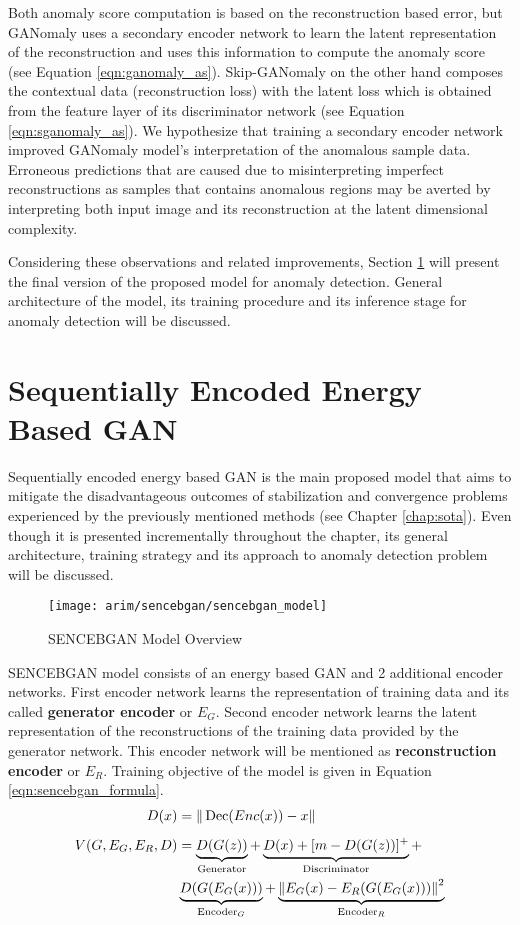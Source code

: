 Both anomaly score computation is based on the reconstruction based error, but GANomaly uses a
secondary encoder network to learn the latent representation of the reconstruction and uses this
information to compute the anomaly score (see Equation \ref{eqn:ganomaly_as}). Skip-GANomaly on the
other hand composes the contextual data (reconstruction loss) with the latent loss which is obtained
from the feature layer of its discriminator network (see Equation \ref{eqn:sganomaly_as}). We hypothesize
that training a secondary encoder network improved GANomaly model's interpretation of the anomalous
sample data. Erroneous predictions that are caused due to misinterpreting imperfect reconstructions
as samples that contains anomalous regions may be averted by interpreting both input image and its
reconstruction at the latent dimensional complexity. 

Considering these observations and related improvements, Section \ref{sec:sencebgan} will present the final version
of the proposed model for anomaly detection. General architecture of the model, its training
procedure and its inference stage for anomaly detection will be discussed.


\section{Sequentially Encoded Energy Based GAN}
\label{sec:sencebgan}

Sequentially encoded energy based GAN is the main proposed model that
aims to mitigate the disadvantageous outcomes of stabilization and convergence problems experienced
by the previously mentioned methods (see Chapter \ref{chap:sota}). Even though it is presented
incrementally throughout the chapter, its general architecture, training strategy and its approach
to anomaly detection problem will be discussed.
\begin{figure}[h!]
	\centering
	\texttt{[image: arim/sencebgan/sencebgan\_model]}
	\caption{SENCEBGAN Model Overview }
	\label{fig:sencebgan_model}
\end{figure}

SENCEBGAN model consists of an energy based GAN and 2 additional encoder
networks. First encoder network learns the representation of training data and its called
\textbf{generator encoder} or $E_{G}$. Second encoder network learns the latent representation of the reconstructions
of the training data provided by the generator network. This encoder network will be mentioned as
\textbf{reconstruction encoder} or $E_{R}$. Training objective of the model is given in Equation
\ref{eqn:sencebgan_formula}.
\begin{equation}
	\begin{aligned}
		D(x)&=\|\operatorname{Dec}(E n c(x))-x\|\\[5pt]
		V(G,E_{G},E_{R}, D) &= \underbrace{D(G(z))}_{\text{Generator}} + \underbrace{D(x)+[m-D(G(z))]^{+}}_{\text{Discriminator}} +\\ & \underbrace{D(G(E_{G}(x)))}_{\text{Encoder}_{G}} + \underbrace{\left\lVert E_{G}(x) - E_{R}(G(E_{G}(x)))\right\rVert^2}_{\text{Encoder}_{R}}
	\end{aligned}
	\label{eqn:sencebgan_formula}
\end{equation}

